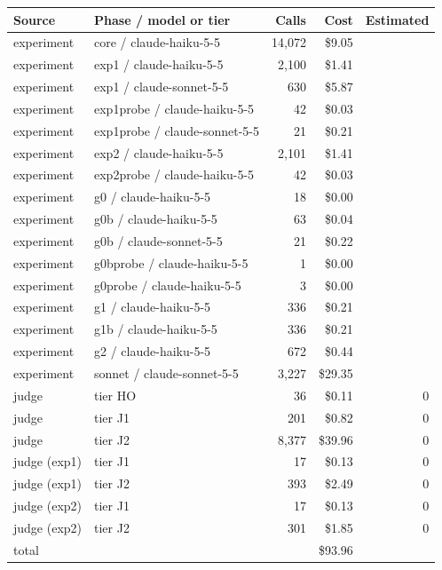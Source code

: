 \begin{tabular}{llrrr}
\toprule
Source & Phase / model or tier & Calls & Cost & Estimated \\
\midrule
experiment & core / claude-haiku-5-5 & 14{,}072 & \$9.05 &  \\
experiment & exp1 / claude-haiku-5-5 & 2{,}100 & \$1.41 &  \\
experiment & exp1 / claude-sonnet-5-5 & 630 & \$5.87 &  \\
experiment & exp1probe / claude-haiku-5-5 & 42 & \$0.03 &  \\
experiment & exp1probe / claude-sonnet-5-5 & 21 & \$0.21 &  \\
experiment & exp2 / claude-haiku-5-5 & 2{,}101 & \$1.41 &  \\
experiment & exp2probe / claude-haiku-5-5 & 42 & \$0.03 &  \\
experiment & g0 / claude-haiku-5-5 & 18 & \$0.00 &  \\
experiment & g0b / claude-haiku-5-5 & 63 & \$0.04 &  \\
experiment & g0b / claude-sonnet-5-5 & 21 & \$0.22 &  \\
experiment & g0bprobe / claude-haiku-5-5 & 1 & \$0.00 &  \\
experiment & g0probe / claude-haiku-5-5 & 3 & \$0.00 &  \\
experiment & g1 / claude-haiku-5-5 & 336 & \$0.21 &  \\
experiment & g1b / claude-haiku-5-5 & 336 & \$0.21 &  \\
experiment & g2 / claude-haiku-5-5 & 672 & \$0.44 &  \\
experiment & sonnet / claude-sonnet-5-5 & 3{,}227 & \$29.35 &  \\
\midrule
judge & tier HO & 36 & \$0.11 & 0 \\
judge & tier J1 & 201 & \$0.82 & 0 \\
judge & tier J2 & 8{,}377 & \$39.96 & 0 \\
judge (exp1) & tier J1 & 17 & \$0.13 & 0 \\
judge (exp1) & tier J2 & 393 & \$2.49 & 0 \\
judge (exp2) & tier J1 & 17 & \$0.13 & 0 \\
judge (exp2) & tier J2 & 301 & \$1.85 & 0 \\
\midrule
total &  &  & \$93.96 &  \\
\bottomrule
\end{tabular}
